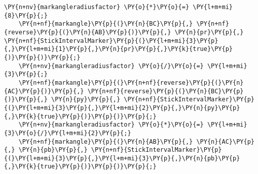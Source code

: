 \begin{Verbatim}[commandchars=\\\{\}]
    \PY{n+nv}{markangleradiusfactor} \PY{o}{*}\PY{o}{=} \PY{l+m+mi}{8}\PY{p}{;}
    \PY{n+nf}{markangle}\PY{p}{(}\PY{n}{BC}\PY{p}{,} \PY{n+nf}{reverse}\PY{p}{(}\PY{n}{AB}\PY{p}{)}\PY{p}{,} \PY{n}{pr}\PY{p}{,} \PY{n+nf}{StickIntervalMarker}\PY{p}{(}\PY{l+m+mi}{3}\PY{p}{,}\PY{l+m+mi}{1}\PY{p}{,}\PY{n}{pr}\PY{p}{,}\PY{k}{true}\PY{p}{)}\PY{p}{)}\PY{p}{;}
    \PY{n+nv}{markangleradiusfactor} \PY{o}{/}\PY{o}{=} \PY{l+m+mi}{3}\PY{p}{;}
    \PY{n+nf}{markangle}\PY{p}{(}\PY{n+nf}{reverse}\PY{p}{(}\PY{n}{AC}\PY{p}{)}\PY{p}{,} \PY{n+nf}{reverse}\PY{p}{(}\PY{n}{BC}\PY{p}{)}\PY{p}{,} \PY{n}{py}\PY{p}{,} \PY{n+nf}{StickIntervalMarker}\PY{p}{(}\PY{l+m+mi}{3}\PY{p}{,}\PY{l+m+mi}{2}\PY{p}{,}\PY{n}{py}\PY{p}{,}\PY{k}{true}\PY{p}{)}\PY{p}{)}\PY{p}{;}
    \PY{n+nv}{markangleradiusfactor} \PY{o}{*}\PY{o}{=} \PY{l+m+mi}{3}\PY{o}{/}\PY{l+m+mi}{2}\PY{p}{;}
    \PY{n+nf}{markangle}\PY{p}{(}\PY{n}{AB}\PY{p}{,} \PY{n}{AC}\PY{p}{,} \PY{n}{pb}\PY{p}{,} \PY{n+nf}{StickIntervalMarker}\PY{p}{(}\PY{l+m+mi}{3}\PY{p}{,}\PY{l+m+mi}{3}\PY{p}{,}\PY{n}{pb}\PY{p}{,}\PY{k}{true}\PY{p}{)}\PY{p}{)}\PY{p}{;}
\end{Verbatim}
